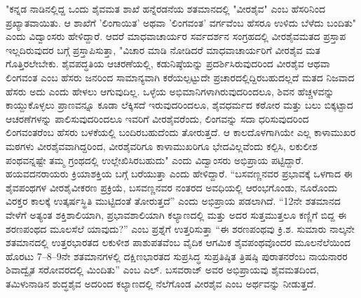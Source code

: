  "ಕನ್ನಡ ನಾಡಿನಲ್ಲಿದ್ದ ಒಂದು ಶೈವಮತ ಶಾಖೆ ಹನ್ನೆರಡನೆಯ ಶತಮಾನದಲ್ಲಿ "ವೀರಶೈವ" ಎಂಬ ಹೆಸರಿನಿಂದ ಪ್ರಖ್ಯಾತವಾಯಿತು. ಆ ಶಾಖೆಗೆ ’ಲಿಂಗಾಯಿತ’ ಅಥವಾ ’ಲಿಂಗವಂತ’ ವರ್ಗವೆಂಬ ಹೆಸರೂ ಉಳಿದು ಬೆಳೆದು ಬಂದಿತು" ಎಂದು ವಿದ್ವಾಂಸರು ಹೇಳಿದ್ದಾರೆ. ಆದರೆ ಮಾಧವಾಚಾರ್ಯರ ಸರ್ವದರ್ಶನ ಸಂಗ್ರಹದಲ್ಲಿ ವೀರಶೈವಮತದ ಪ್ರಸ್ತಾಪ ಇಲ್ಲದಿರುವುದರ ಬಗ್ಗೆ ಪ್ರಸ್ತಾಪಿಸುತ್ತಾ, "ವಿಚಾರ ಮಾಡಿ ನೋಡಿದರೆ ಮಾಧವಾಚಾರ್ಯರಿಗೆ ವೀರಶೈವ ಮತ ಗೊತ್ತಿರಲೇಬೇಕು. ಶೈವಪದ್ಧತಿಯ ಆಚರಣೆಯಲ್ಲಿ, ಕಡುನಿಷ್ಠೆಯನ್ನು ಪ್ರದರ್ಶಿಸಿರುವುದರಿಂದ ವೀರಶೈವ ಆಥವಾ ಲಿಂಗವಂತ ಎಂಬ ಹೆಸರು ಜನರಿಂದ ಸಾಮಾನ್ಯವಾಗಿ ಕರೆಯಲ್ಪಟ್ಟುದೇ ಪ್ರಚಾರದಲ್ಲಿದ್ದಿರಬಹುದಲ್ಲದೆ ಮತದ ನಿಜವಾದ ಹೆಸರು ಅದು ಎಂದು ಹೇಳಲು ಆಗುವುದಿಲ್ಲ. ಒಳ್ಳೆಯ ಅಭಿಮಾನಿಗಳಾಗಿರುವುದರಿಂದಲೂ, ಶಿವನ ಹೆಚ್ಚಳವನ್ನು ಕಾಯ್ದುಕೊಳ್ಳಲು ಪ್ರಾಣವನ್ನೂ ಕೂಡಾ ಲೆಕ್ಕಿಸದೆ ಇರುವುದರಿಂದಲೂ, ಶೈವಧರ್ಮದ ಕಠೋರ ಮತ್ತು ಬಲು ಬಿಕ್ಕಟ್ಟಾದ ಆಚರಣೆಗಳನ್ನು ಪಾಲಿಸುವುದರಿಂದಲೂ ಇವರಿಗೆ ವೀರಶೈವರೆಂದು, ಲಿಂಗವನ್ನು ಸದಾ ಧರಿಸುವುದರಿಂದ ಲಿಂಗವಂತರೆಂಬ ಹೆಸರು ಬಳಕೆಯಲ್ಲಿ ಬಂದಿರಬಹುದೆಂದು ತೋರುತ್ತದೆ. ಆ ಕಾಲದೊಳಗಾಗಿಯೇ ಎಲ್ಲ ಕಾಳಾಮುಖರ ಮಠಗಳು ವೀರಶೈವವಾಗಿದ್ದರಿಂದ, ವೀರಶೈವರಿಗೂ ಕಾಳಾಮುಖರಿಗೂ ಭೇದವಿಲ್ಲವೆಂದು ಕಲ್ಪಿಸಿ, ಲಕುಲೀಶ ಪಂಥವನ್ನಷ್ಟೇ ತಮ್ಮ ಗ್ರಂಥದಲ್ಲಿ ಉಲ್ಲೇಖಿಸಿರಬಹುದು" ಎಂದು ವಿದ್ವಾಂಸರು ಅಭಿಪ್ರಾಯ ಪಟ್ಟಿದ್ದಾರೆ. ಹಯವದನರಾಯರು ಕ್ರಿಯಾಶಕ್ತಿಯ ಬಗ್ಗೆ ಬರೆಯುತ್ತಾ  ಎಂದು ಹೇಳಿದ್ದಾರೆ. “ಬಸವಣ್ಣನವರ ಪ್ರಭಾವಕ್ಕೆ ಒಳಗಾದ ಈ ಶೈವಪಂಥಗಳ ವೀರಶೈವೀಕರಣ ಪ್ರಕ್ರಿಯೆ, ಬಸವಣ್ಣನವರ ನಂತರದ ಅವಧಿಯಲ್ಲಿ ಆರಂಭಗೊಂಡು, ನೂರೊಂದು ವಿರಕ್ತರ ಕಾಲಕ್ಕೆ ಉತ್ಕರ್ಷಸ್ಥಿತಿ ಮುಟ್ಟಿದಂತೆ ತೋರುತ್ತದೆ” ಎಂದು ಅಭಿಪ್ರಾಯ ಪಡಲಾಗಿದೆ. “12ನೇ ಶತಮಾನದ ವೇಳೆಗೆ ಅತ್ಯಂತ ಶಕ್ತಿಶಾಲಿಯಾಗಿ, ಪ್ರಭಾವಶಾಲಿಯಾಗಿ ಕಲ್ಯಾಣದಲ್ಲಿ ಮತ್ತು ಅದರ ಸುತ್ತಮುತ್ತಲೂ ಕಣ್ಣಿಗೆ ಬಿದ್ದ ಈ ಶರಣಪಂಥದ ಮೂಲಸೆಲೆ ಯಾವುದು?” ಎಂಬ ಪ್ರಶ್ನೆಗೆ ಉತ್ತರಿಸುತ್ತಾ “ಈ ಶರಣಪಂಥವು ಕ್ರಿ.ಶ. ಸುಮಾರು ನಾಲ್ಕನೇ ಶತಮಾನದಲ್ಲಿ ಉತ್ತರಭಾರತದ ಲಕುಳೀಶ ಪಾಶುಪತವೆಂಬ ವೈದಿಕ ಆಗಮಿಕ ಶೈವಪಂಥವೊಂದರ ಮೂಲನೆಲೆಯಿಂದ ಹೊರಟು 7–8–9ನೇ ಶತಮಾನಗಳಲ್ಲಿ ದಕ್ಷಿಣಭಾರತದ ಸುಪ್ರಸಿದ್ಧ ಸುಪ್ರತಿಷ್ಠಿತ ತ್ರಿಷಷ್ಠಿ ಪುರಾತನರೆಂಬ ನಾಯನಾರರ ಶಿವಾದ್ವೈತ ಸರೋವರದಲ್ಲಿ ಮಿಂದಿತು” ಎಂಬ ಎಲ್​. ಬಸವರಾಜ್​ ಅವರ ಅಭಿಪ್ರಾಯವು ಶೈವಮತದಿಂದ, ತಮಿಳುನಾಡಿನ ಶುದ್ಧಶೈವ ಅದರಿಂದ ಕಲ್ಯಾಣದಲ್ಲಿ ನೆಲೆಗೊಂಡ ವೀರಶೈವ ಎಂಬ ಅರ್ಥವನ್ನು ನೀಡುತ್ತದೆ.

